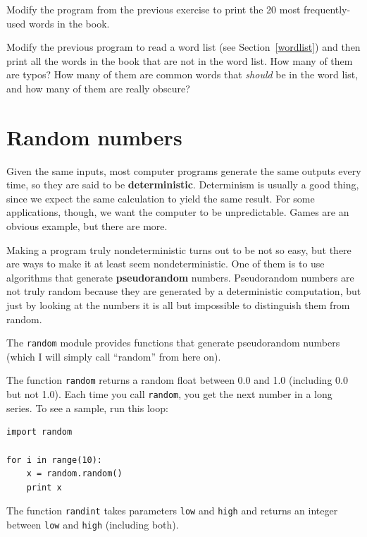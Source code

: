 \documentclass[10pt]{book}
\begin{document}
\begin{exercise}

Modify the program from the previous exercise to print the
20 most frequently-used words in the book.

\end{exercise}


\begin{exercise}

Modify the previous program to read a word list (see
Section~\ref{wordlist}) and then print all the words in the book that
are not in the word list.  How many of them are typos?  How many of
them are common words that {\em should} be in the word list, and how
many of them are really obscure?

\end{exercise}


\section{Random numbers}

Given the same inputs, most computer programs generate the same
outputs every time, so they are said to be {\bf deterministic}.
Determinism is usually a good thing, since we expect the same
calculation to yield the same result.  For some applications, though,
we want the computer to be unpredictable.  Games are an obvious
example, but there are more.

Making a program truly nondeterministic turns out to be not so easy,
but there are ways to make it at least seem nondeterministic.  One of
them is to use algorithms that generate {\bf pseudorandom} numbers.
Pseudorandom numbers are not truly random because they are generated
by a deterministic computation, but just by looking at the numbers it
is all but impossible to distinguish them from random.

The {\tt random} module provides functions that generate
pseudorandom numbers (which I will simply call ``random'' from
here on).

The function {\tt random} returns a random float
between 0.0 and 1.0 (including 0.0 but not 1.0).  Each time you
call {\tt random}, you get the next number in a long series.  To see a
sample, run this loop:

\begin{verbatim}
import random

for i in range(10):
    x = random.random()
    print x
\end{verbatim}
%
The function {\tt randint} takes parameters {\tt low} and
{\tt high} and returns an integer between {\tt low} and
{\tt high} (including both).
\end{document}
